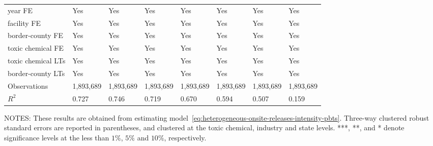 \begin{table}[H]
{\begin{tabular}{@{}llllllll@{}}
            year FE                         & Yes       & Yes           & Yes       & Yes          & Yes             & Yes           & Yes                 \\
            facility FE                     & Yes       & Yes           & Yes       & Yes          & Yes             & Yes           & Yes                 \\
            border-county FE                & Yes       & Yes           & Yes       & Yes          & Yes             & Yes           & Yes                 \\
            toxic chemical FE               & Yes       & Yes           & Yes       & Yes          & Yes             & Yes           & Yes                 \\
            toxic chemical LTs              & Yes       & Yes           & Yes       & Yes          & Yes             & Yes           & Yes                 \\
            border-county LTs               & Yes       & Yes           & Yes       & Yes          & Yes             & Yes           & Yes                 \\\midrule
            Observations                    & 1,893,689 & 1,893,689     & 1,893,689 & 1,893,689    & 1,893,689       & 1,893,689     & 1,893,689           \\
            $R^2$                           & 0.727     & 0.746         & 0.719     & 0.670        & 0.594           & 0.507         & 0.159               \\ \bottomrule\bottomrule
        \end{tabular}%
    }
    \begin{minipage}{\columnwidth}
        \vspace{0.05in}
        \tiny NOTES: These results are obtained from estimating model~\ref{eq:heterogeneous-onsite-releases-intensity-pbts}. Three-way clustered robust standard errors are reported in parentheses, and clustered at the toxic chemical, industry and state levels. ***, **, and * denote significance levels at the less than $1\%$, $5\%$ and $10\%$, respectively.
    \end{minipage}
\end{table}